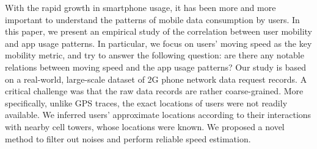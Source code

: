 With the rapid growth in smartphone usage, it has been more and more important to understand the patterns of mobile data consumption by users.
In this paper, we present an empirical study 
of the correlation between user mobility and app usage patterns.
In particular, we focus on users' moving speed as the key mobility metric,
and try to answer the following question:
are there any notable relations between moving speed and the app usage patterns?
Our study is based on a real-world, large-scale dataset of 2G phone network data request records.
A critical challenge was that the raw data records are rather coarse-grained.
More specifically, unlike GPS traces, the exact locations of users were not readily available.
We inferred users' approximate locations according to their interactions with nearby cell towers, whose locations were known.
We %
proposed a novel method to filter out noises and perform reliable speed estimation.
